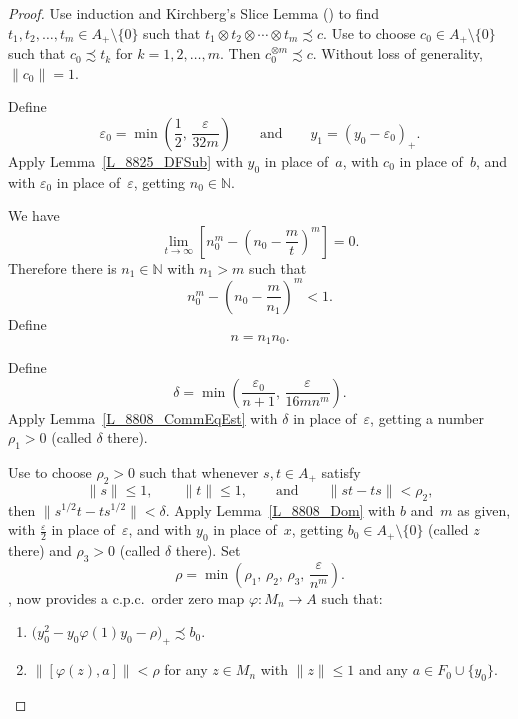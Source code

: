 \documentclass[11pt]{amsart}
\theoremstyle{plain}
\theoremstyle{definition}
\theoremstyle{remark}
\numberwithin{equation}{section}
\newcounter{TmpEnumi}
\newcommand{\N}{\mathbb{N}}
\newcommand{\dt}{\delta}
\newcommand{\ep}{\varepsilon}
\newcommand{\rh}{\rho}
\newcommand{\andeqn}{\qquad {\mbox{and}} \qquad}
\begin{document}
\begin{proof}
Use induction and Kirchberg's Slice Lemma (\cite[Lemma~4.1.9]{Ro02})
to find $t_1, t_2, \ldots, t_m \in A_{+} \setminus \{ 0 \}$
such that $t_1 \otimes t_2 \otimes \cdots \otimes t_m \precsim c$.
Use \cite[Lemma 2.6]{Ph14}
to choose $c_0 \in A_{+} \setminus \{ 0 \}$
such that $c_0 \precsim t_k$ for $k = 1, 2, \ldots, m$.
Then $c_0^{\otimes m} \precsim c$.
Without loss of generality,
$\| c_0 \| = 1$.

Define
\[
\ep_0 = \min \left( \frac{1}{2}, \, \frac{\ep}{32 m} \right)
\andeqn
y_1 = (y_0 - \ep_0)_{+}.
\]
Apply Lemma~\ref{L_8825_DFSub}
with $y_0$ in place of~$a$,
with $c_0$ in place of~$b$,
and with $\ep_0$ in place of~$\ep$,
getting $n_0 \in \N$.

We have
\[
\lim_{t \to \infty}
 \left[ n_0^m - \left( n_0 - \frac{m}{t} \right)^m \right]
= 0.
\]
Therefore there is $n_1 \in \N$ with $n_1 >m$ such that
%
\begin{equation}\label{Eq_8816_n1Est}
n_0^m - \left( n_0 - \frac{m}{n_1} \right)^m < 1.
\end{equation}
%
Define
%
\begin{equation}\label{Eq_8816_nDef}
n = n_1 n_0.
\end{equation}
%

Define
\[
\dt = \min \left( \frac{\ep_0}{n + 1}, \, \frac{\ep}{16 m n^m} \right).
\]
Apply Lemma~\ref{L_8808_CommEqEst}
with $\dt$ in place of~$\ep$,
getting a number $\rh_1 > 0$
(called $\dt$ there).

Use \cite[Lemma 2.5]{AP16} to choose $\rh_2 > 0$
such that whenever
$s, t \in A_{+}$
satisfy
\[
\| s \| \leq 1,
\qquad
\| t \| \leq 1,
\qquad {\mbox{and}} \qquad
\| s t - t s \| < \rh_2,
\]
then
$\bigl\| s^{1/2} t - t s^{1/2} \bigr\| < \dt$.
Apply Lemma~\ref{L_8808_Dom} with $b$ and~$m$ as given,
with $\frac{\ep}{2}$ in place of~$\ep$,
and with $y_0$ in place of~$x$,
getting $b_0  \in A_{+} \setminus \{ 0 \}$ (called $z$ there)
and $\rh_3 > 0$ (called $\dt$ there).
Set
\[
\rh = \min \left( \rh_1, \, \rh_2, \, \rh_3, \, \frac{\ep}{n^m} \right).
\]
\cite[Definition~3.6]{AGJP21}, now provides
a c.p.c.~order zero map $\varphi \colon M_{n} \to A$
such that:
%
\begin{enumerate}
%
\setcounter{enumi}{\value{TmpEnumi}}
\item\label{T_8816_PermwTRP_deftza_it1}
$\bigl( y_0^{2} - y_0 \varphi (1) y_0 - \rh \bigr)_{+}
 \precsim b_0$.
%
\item\label{T_8816_PermwTRP_deftza_it2}
$\| [\varphi (z), a] \| < \rh$
for any $z \in M_{n}$ with $\| z \| \leq 1$
and any $a \in F_0 \cup \{ y_0 \}$.
\end{enumerate}
%


\end{proof}
\end{document}

